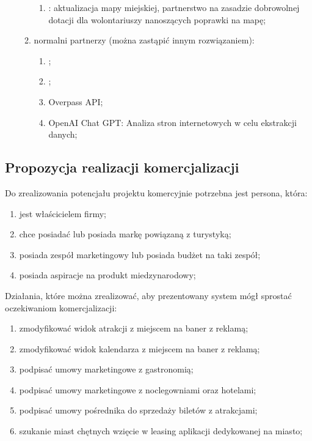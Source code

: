 \begin{enumerate}[label=\Roman*.]
\begin{enumerate}[label=\alph*.]
\begin{enumerate}[label=\roman*.]
            \item {}:  aktualizacja mapy miejskiej, partnerstwo na zasadzie dobrowolnej dotacji dla wolontariuszy nanoszących poprawki na mapę;
        \end{enumerate}
        \item normalni partnerzy (można zastąpić innym rozwiązaniem):
        \begin{enumerate}[label=\roman*.]
            \item {};
            \item {};
            \item Overpass API;
            \item OpenAI Chat GPT: Analiza stron internetowych w celu ekstrakcji danych;
        \end{enumerate}
    \end{enumerate}
\end{enumerate}
\subsection{Propozycja realizacji komercjalizacji}
\label{sec:propozycja-komercjalizacji}
\indent Do zrealizowania potencjału projektu komercyjnie potrzebna jest persona, która:
\begin{enumerate}[label=\roman*.]
    \item jest właścicielem firmy;
    \item chce posiadać lub posiada markę powiązaną z turystyką;
    \item posiada zespół marketingowy lub posiada budżet na taki zespół;
    \item posiada aspiracje na produkt miedzynarodowy;
\end{enumerate}
\indent Działania, które można zrealizować, aby prezentowany system mógł sprostać oczekiwaniom komercjalizacji:
\begin{enumerate}[label=\roman*.]
    \item zmodyfikować widok atrakcji z miejscem na baner z reklamą;
    \item zmodyfikować widok kalendarza z miejscem na baner z reklamą;
    \item podpisać umowy marketingowe z gastronomią;
    \item podpisać umowy marketingowe z noclegowniami oraz hotelami;
    \item podpisać umowy pośrednika do sprzedaży biletów z atrakcjami;
    \item szukanie miast chętnych wzięcie w leasing aplikacji dedykowanej na miasto;
\end{enumerate}
